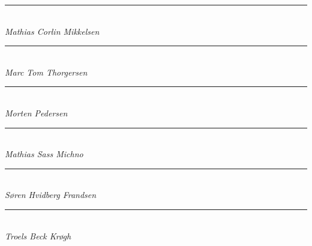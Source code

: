 \begin{minipage}{\textwidth}
\centering
\vspace{5cm}
			\Large
      \begin{minipage}{0.45\textwidth}
      \centering
      \rule{\textwidth}{0.5pt}\\
			\textit{Mathias Corlin Mikkelsen}
      \end{minipage}
		
		  \vspace{70pt}
			\Large
      \begin{minipage}{0.45\textwidth}
      \centering
      \rule{\textwidth}{0.5pt}\\
			\textit{Marc Tom Thorgersen}
		  \end{minipage}
    
		      \vspace{70pt}
			\Large
      \begin{minipage}{0.45\textwidth}
      \centering
      \rule{\textwidth}{0.5pt}\\
			\textit{Morten Pedersen}
		  \end{minipage}
    
		      \vspace{70pt}
			\Large
      \begin{minipage}{0.45\textwidth}
      \centering
      \rule{\textwidth}{0.5pt}\\
			\textit{Mathias Sass Michno}
		  \end{minipage}
          \vspace{70pt}

			\Large
      \begin{minipage}{0.45\textwidth}
      \centering
      \rule{\textwidth}{0.5pt}\\
			\textit{Søren Hvidberg Frandsen}
		  \end{minipage}
          \vspace{70pt}

			\Large
      \begin{minipage}{0.45\textwidth}
      \centering
      \rule{\textwidth}{0.5pt}\\
			\textit{Troels Beck Krøgh}
		  \end{minipage}
    
\end{minipage}
